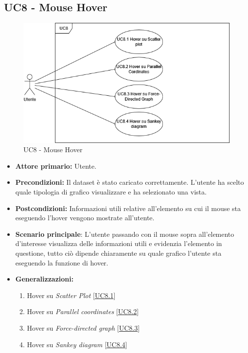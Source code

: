 \subsection{UC8 - Mouse Hover}
\label{sec:UC8}
\begin{figure}[h!]
    \centering
    \includegraphics[scale=0.55]{../../assets/UC8-MouseHover.png}
    \caption{UC8 - Mouse Hover}
\end{figure}
\begin{itemize}
    \item \textbf{Attore primario:} Utente.
    \item \textbf{Precondizioni:} Il dataset è stato caricato correttamente. L'utente ha scelto quale tipologia di grafico visualizzare e ha selezionato una vista.
    \item \textbf{Postcondizioni:} Informazioni utili relative all'elemento su cui il mouse sta eseguendo l'hover vengono mostrate all'utente.
    \item \textbf{Scenario principale}: L'utente passando con il mouse sopra all'elemento d'interesse visualizza delle informazioni utili e evidenzia l'elemento in questione, tutto ciò dipende chiaramente su quale grafico l'utente sta eseguendo la funzione di hover.
    \item \textbf{Generalizzazioni:} \begin{enumerate}
                                        \item Hover su \textit{Scatter Plot} [\hyperref[sec:UC8.1]{UC8.1}]
                                        \item Hover su \textit{Parallel coordinates} [\hyperref[sec:UC8.2]{UC8.2}]
                                        \item Hover su \textit{Force-directed graph} [\hyperref[sec:UC8.3]{UC8.3}]
                                        \item Hover su \textit{Sankey diagram} [\hyperref[sec:UC8.4]{UC8.4}]
                                    \end{enumerate}
\end{itemize}

